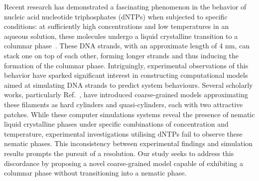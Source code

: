 \documentclass[aip,jcp, amsmath, amssymb, reprint]{revtex4-1}
\begin{document}
Recent research has demonstrated a fascinating phenomenon in the behavior of nucleic acid nucleotide triphosphates
(dNTPs) when subjected to specific conditions: at sufficiently high concentrations and low temperatures in an aqueous
solution, these molecules undergo a liquid crystalline transition to a columnar phase~\cite{Smith}. 
These
DNA strands, with an approximate length of 4 nm, can stack one on top of each other, forming longer strands and thus 
inducing the formation of the columnar phase. Intriguingly, experimental observations of this behavior 
have sparked significant interest in constructing computational models aimed at simulating DNA strands to predict system
behaviours. Several scholarly works, particularly Ref.~\cite{Nguyen,C0JM02355H,Bellini}, have
introduced coarse-grained models approximating these filaments as hard cylinders and quasi-cylinders, each with two
attractive patches. While these computer simulations systems reveal the presence of nematic liquid crystalline phases
under specific combinations of concentration and temperature, experimental investigations utilising dNTPs fail to
observe these nematic phases. This inconsistency between experimental findings and simulation results prompts the
pursuit of a resolution. Our study seeks to address this discordance by proposing a novel coarse-grained model capable
of exhibiting a columnar phase without transitioning into a nematic phase.
\end{document}
